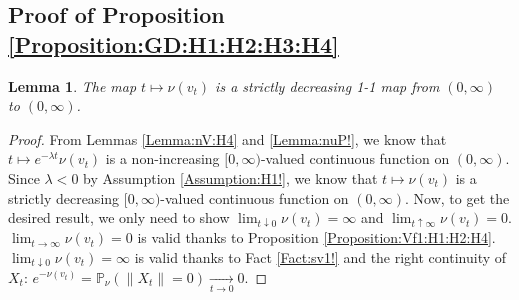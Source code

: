 \documentclass[12pt,a4paper]{amsart}
\numberwithin{equation}{section}
\theoremstyle{plain}
\newtheorem{lem}[thm]{Lemma}
\theoremstyle{definition}
\theoremstyle{remark}
\begin{document}
\subsection{Proof of Proposition \ref{Proposition:GD:H1:H2:H3:H4}}
\begin{lem} \label{Lemma:OtO:H1:H2:H4}
The map $t \mapsto \nu(v_t)$ is a strictly decreasing 1-1 map from $(0,\infty)$ to $(0,\infty)$.
\end{lem}
\begin{proof}
From Lemmas \ref{Lemma:nV:H4} and \ref{Lemma:nuP!}, we know that $ t\mapsto e^{-\lambda t}\nu(v_t)$ is a non-increasing $[0,\infty)$-valued continuous function on $(0,\infty)$.
Since $\lambda < 0$ by Assumption \ref{Assumption:H1!}, we know that $t\mapsto \nu(v_t)$ is a strictly decreasing $[0,\infty)$-valued continuous function on $(0,\infty)$.
Now, to get the desired result, we only need to show $\lim_{t\downarrow 0}\nu(v_t) = \infty$ and $\lim_{t\uparrow \infty}\nu(v_t) = 0$.
$\lim_{t\to \infty} \nu(v_t) = 0$ is valid thanks to Proposition \ref{Proposition:Vf1:H1:H2:H4}.
$\lim_{t\downarrow 0} \nu(v_t) = \infty$ is valid thanks to Fact \ref{Fact:sv1!} 
and the right continuity of $X_t$: $e^{-\nu(v_t)} = \mathbb P_\nu (\|X_t\| = 0) \xrightarrow[t\to 0]{} 0$.
\end{proof}
\end{document}
